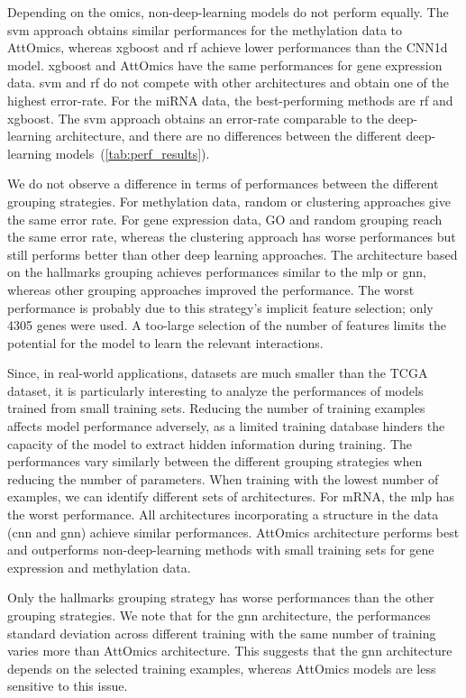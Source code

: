 \documentclass[../main.tex]{subfiles}
\begin{document}
		Depending on the omics, non-deep-learning models do not perform equally.
		The \gls{svm} approach obtains similar performances for the methylation data to AttOmics, whereas \gls{xgboost} and \gls{rf} achieve lower performances than the CNN1d model.
		\gls{xgboost} and AttOmics have the same performances for gene expression data.
		\gls{svm} and \gls{rf} do not compete with other architectures and obtain one of the highest error-rate.
		For the miRNA data, the best-performing methods are \gls{rf} and \gls{xgboost}.
		The \gls{svm} approach obtains an error-rate comparable to the deep-learning architecture, and there are no differences between the different deep-learning models~(\cref{tab:perf_results}).

		We do not observe a difference in terms of performances between the different grouping strategies.
		For methylation data, random or clustering approaches give the same error rate.
		For gene expression data, GO and random grouping reach the same error rate, whereas the clustering approach has worse performances but still performs better than other deep learning approaches.
		The architecture based on the hallmarks grouping achieves performances similar to the \gls{mlp} or \gls{gnn}, whereas other grouping approaches improved the performance.
		The worst performance is probably due to this strategy's implicit feature selection; only 4305 genes were used.
		A too-large selection of the number of features limits the potential for the model to learn the relevant interactions.

		Since, in real-world applications, datasets are much smaller than the TCGA dataset, it is particularly interesting to analyze the performances of models trained from small training sets.
		Reducing the number of training examples affects model performance adversely, as a limited training database hinders the capacity of the model to extract hidden information during training.
		The performances vary similarly between the different grouping strategies when reducing the number of parameters.
		When training with the lowest number of examples, we can identify different sets of architectures.
		For mRNA, the \gls{mlp} has the worst performance.
		All architectures incorporating a structure in the data (\gls{cnn} and \gls{gnn}) achieve similar performances.
		AttOmics architecture performs best and outperforms non-deep-learning methods with small training sets for gene expression and methylation data.

		Only the hallmarks grouping strategy has worse performances than the other grouping strategies.
		We note that for the \gls{gnn} architecture, the performances standard deviation across different training with the same number of training varies more than AttOmics architecture.
		This suggests that the \gls{gnn} architecture depends on the selected training examples, whereas AttOmics models are less sensitive to this issue.
\end{document}
